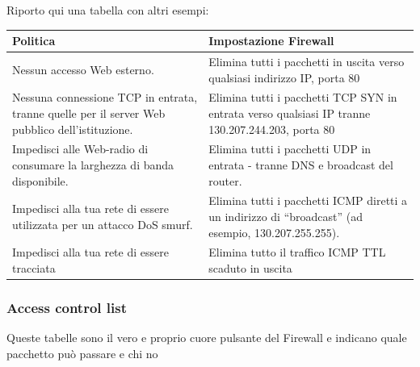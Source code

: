 Riporto qui una tabella con altri esempi:
\begin{center}
    \begin{tabularx}{\textwidth}{|X|X|}
        \hline
        \textbf{Politica} & \textbf{Impostazione Firewall} \\
        \hline
        Nessun accesso Web esterno. & Elimina tutti i pacchetti in uscita verso qualsiasi indirizzo IP, porta 80 \\
        \hline
        Nessuna connessione TCP in entrata, tranne quelle per il server Web pubblico dell'istituzione. & Elimina tutti i pacchetti TCP SYN in entrata verso qualsiasi IP tranne 130.207.244.203, porta 80 \\
        \hline
        Impedisci alle Web-radio di consumare la larghezza di banda disponibile. & Elimina tutti i pacchetti UDP in entrata - tranne DNS e broadcast del router. \\
        \hline
        Impedisci alla tua rete di essere utilizzata per un attacco DoS smurf. & Elimina tutti i pacchetti ICMP diretti a un indirizzo di “broadcast” (ad esempio, 130.207.255.255). \\
        \hline
        Impedisci alla tua rete di essere tracciata & Elimina tutto il traffico ICMP TTL scaduto in uscita \\
        \hline
        \end{tabularx}
\end{center}

\subsubsection{Access control list}

Queste tabelle sono il vero e proprio cuore pulsante del Firewall e indicano quale pacchetto può passare e chi no
